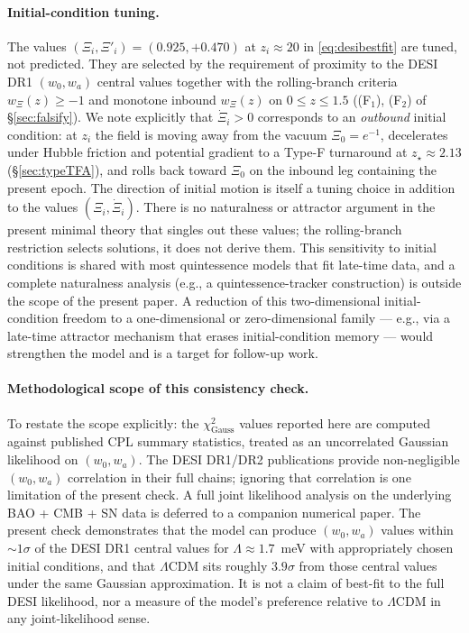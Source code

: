 \documentclass[11pt,reqno]{amsart}
\theoremstyle{plain}
\theoremstyle{definition}
\theoremstyle{remark}
\begin{document}
\paragraph{Initial-condition tuning.}
The values $(\Xi_i, \Xi'_i) = (0.925, +0.470)$ at $z_i \approx 20$ in
\eqref{eq:desibestfit} are tuned, not predicted. They are selected by
the requirement of proximity to the DESI DR1 $(w_0, w_a)$ central values
together with the rolling-branch criteria $w_\Xi(z) \geq -1$ and
monotone inbound $w_\Xi(z)$ on $0 \leq z \leq 1.5$ ((F$_1$), (F$_2$) of
\S\ref{sec:falsify}). We note explicitly that $\dot\Xi_i > 0$
corresponds to an \emph{outbound} initial condition: at $z_i$ the
field is moving away from the vacuum $\Xi_0 = e^{-1}$, decelerates
under Hubble friction and potential gradient to a Type-F turnaround at
$z_\star \approx 2.13$ (\S\ref{sec:typeTFA}), and rolls back toward $\Xi_0$
on the inbound leg containing the present epoch. The direction of
initial motion is itself a tuning choice in addition to the values
$(\Xi_i, \dot\Xi_i)$. There is no naturalness or attractor argument in
the present minimal theory that singles out these values; the
rolling-branch restriction selects solutions, it does not derive them.
This sensitivity to initial conditions is shared with most
quintessence models that fit late-time data, and a complete
naturalness analysis (e.g., a quintessence-tracker construction) is
outside the scope of the present paper. A reduction of this
two-dimensional initial-condition freedom to a one-dimensional or
zero-dimensional family --- e.g., via a late-time attractor mechanism
that erases initial-condition memory --- would strengthen the model
and is a target for follow-up work.

\paragraph{Methodological scope of this consistency check.}
To restate the scope explicitly: the $\chi^{2}_{\text{Gauss}}$ values
reported here are computed against published CPL summary statistics,
treated as an uncorrelated Gaussian likelihood on $(w_0, w_a)$. The
DESI DR1/DR2 publications provide non-negligible $(w_0, w_a)$
correlation in their full chains; ignoring that correlation is one
limitation of the present check. A full joint likelihood analysis
on the underlying BAO + CMB + SN data is deferred to a companion
numerical paper. The present check demonstrates that the model can
produce $(w_0, w_a)$ values within $\sim 1\sigma$ of the DESI DR1
central values for $\Lambda \approx 1.7$~meV with appropriately
chosen initial conditions, and that $\Lambda$CDM sits roughly
$3.9\sigma$ from those central values under the same Gaussian
approximation. It is not a claim of best-fit to the full DESI
likelihood, nor a measure of the model's preference relative to
$\Lambda$CDM in any joint-likelihood sense.
\end{document}
